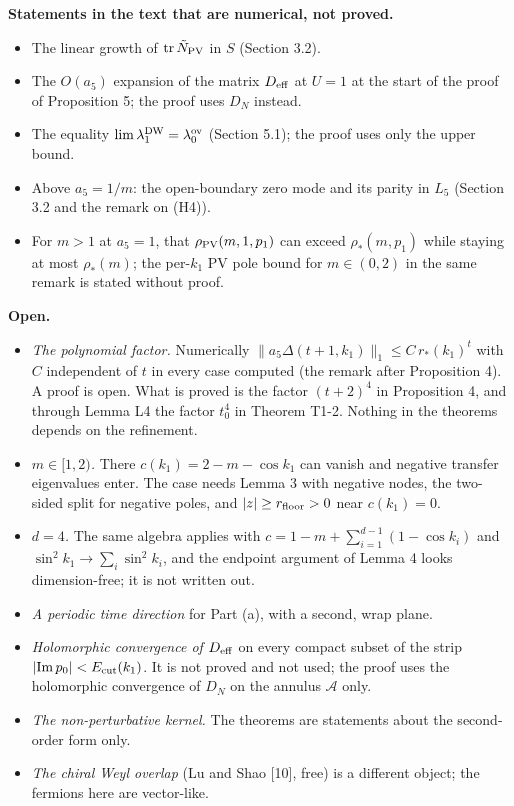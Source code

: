\documentclass[11pt,a4paper]{article}
\begin{document}
{\bfseries\boldmath Statements in the text that are numerical, not proved.}

\begin{itemize}
\item{} The linear growth of $\mathrm{tr}\,\tilde N_{\rm PV}$ in $S$ (Section 3.2).
\item{} The $O(a_5)$ expansion of the matrix $D_{\rm eff}$ at $U=1$ at the start of the proof of Proposition 5; the proof uses $D_N$ instead.
\item{} The equality $\lim\lambda_1^{\rm DW}=\lambda_0^{\rm ov}$ (Section 5.1); the proof uses only the upper bound.
\item{} Above $a_5=1/m$: the open-boundary zero mode and its parity in $L_5$ (Section 3.2 and the remark on (H4)).
\item{} For $m>1$ at $a_5=1$, that $\rho_{\rm PV}(m,1,p_1)$ can exceed $\rho_*(m,p_1)$ while staying at most $\rho_*(m)$; the per-$k_1$ PV pole bound for $m\in(0,2)$ in the same remark is stated without proof.
\end{itemize}

{\bfseries\boldmath Open.}

\begin{itemize}
\item{} \emph{The polynomial factor.} Numerically $\|a_5\Delta(t+1,k_1)\|_1\le C\,r_*(k_1)^t$ with $C$ independent of $t$ in every case computed (the remark after Proposition 4). A proof is open. What is proved is the factor $(t+2)^4$ in Proposition 4, and through Lemma L4 the factor $t_0^4$ in Theorem T1-2. Nothing in the theorems depends on the refinement.
\item{} \emph{$m\in[1,2)$.} There $c(k_1)=2-m-\cos k_1$ can vanish and negative transfer eigenvalues enter. The case needs Lemma 3 with negative nodes, the two-sided split for negative poles, and $|z|\ge r_{\rm floor}>0$ near $c(k_1)=0$.
\item{} \emph{$d=4$.} The same algebra applies with $c=1-m+\sum_{i=1}^{d-1}(1-\cos k_i)$ and $\sin^2k_1\to\sum_i\sin^2k_i$, and the endpoint argument of Lemma 4 looks dimension-free; it is not written out.
\item{} \emph{A periodic time direction} for Part (a), with a second, wrap plane.
\item{} \emph{Holomorphic convergence of $D_{\rm eff}$} on every compact subset of the strip $|\mathrm{Im}\,p_0|<E_{\rm cut}(k_1)$. It is not proved and not used; the proof uses the holomorphic convergence of $D_N$ on the annulus $\mathcal{A}$ only.
\item{} \emph{The non-perturbative kernel.} The theorems are statements about the second-order form only.
\item{} \emph{The chiral Weyl overlap} (Lu and Shao [10], free) is a different object; the fermions here are vector-like.
\end{itemize}
\end{document}
